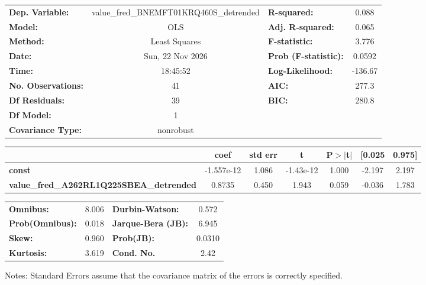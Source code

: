 \begin{center}
\begin{tabular}{lclc}
\toprule
\textbf{Dep. Variable:}                          & value\_fred\_BNEMFT01KRQ460S\_detrended & \textbf{  R-squared:         } &     0.088   \\
\textbf{Model:}                                  &                   OLS                   & \textbf{  Adj. R-squared:    } &     0.065   \\
\textbf{Method:}                                 &              Least Squares              & \textbf{  F-statistic:       } &     3.776   \\
\textbf{Date:}                                   &             Sun, 22 Nov 2026            & \textbf{  Prob (F-statistic):} &   0.0592    \\
\textbf{Time:}                                   &                 18:45:52                & \textbf{  Log-Likelihood:    } &   -136.67   \\
\textbf{No. Observations:}                       &                      41                 & \textbf{  AIC:               } &     277.3   \\
\textbf{Df Residuals:}                           &                      39                 & \textbf{  BIC:               } &     280.8   \\
\textbf{Df Model:}                               &                       1                 & \textbf{                     } &             \\
\textbf{Covariance Type:}                        &                nonrobust                & \textbf{                     } &             \\
\bottomrule
\end{tabular}
\begin{tabular}{lcccccc}
                                                 & \textbf{coef} & \textbf{std err} & \textbf{t} & \textbf{P$> |$t$|$} & \textbf{[0.025} & \textbf{0.975]}  \\
\midrule
\textbf{const}                                   &   -1.557e-12  &        1.086     & -1.43e-12  &         1.000        &       -2.197    &        2.197     \\
\textbf{value\_fred\_A262RL1Q225SBEA\_detrended} &       0.8735  &        0.450     &     1.943  &         0.059        &       -0.036    &        1.783     \\
\bottomrule
\end{tabular}
\begin{tabular}{lclc}
\textbf{Omnibus:}       &  8.006 & \textbf{  Durbin-Watson:     } &    0.572  \\
\textbf{Prob(Omnibus):} &  0.018 & \textbf{  Jarque-Bera (JB):  } &    6.945  \\
\textbf{Skew:}          &  0.960 & \textbf{  Prob(JB):          } &   0.0310  \\
\textbf{Kurtosis:}      &  3.619 & \textbf{  Cond. No.          } &     2.42  \\
\bottomrule
\end{tabular}
\end{center}

Notes: \newline
 [1] Standard Errors assume that the covariance matrix of the errors is correctly specified.